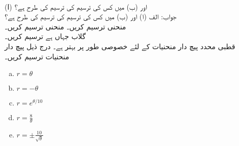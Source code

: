 \\
(ا)  اور (ب)  میں کس کی ترسیم  کی ترسیم کی طرح ہے؟\\
جواب:\quad 
الف
(ا)  اور (ب)  میں کس کی ترسیم  کی ترسیم کی طرح ہے؟
\\
منحنی  ترسیم کریں۔
منحنی  ترسیم کریں۔
\\
گلاب  جہاں  ہے ترسیم کریں۔
\\
قطبی محدد پیچ دار منحنیات کے لئے خصوصی طور پر بہتر ہے۔ درج ذیل پیچ دار منحنیات ترسیم کریں۔
\begin{multicols}{3}
\begin{enumerate}[a.]
\item
$r=\theta$
\item
$r=-\theta$
\item
$r=e^{\theta/10}$
\item
$r=\tfrac{8}{\theta}$
\item
$r=\pm\tfrac{10}{\sqrt{\theta}}$
\end{enumerate}
\end{multicols}

